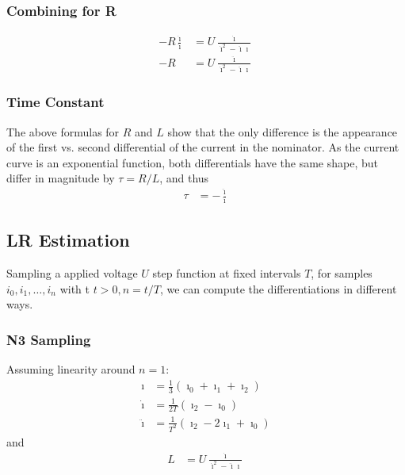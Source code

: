 \documentclass[12pt,a4paper,oneside,openany]{article}
\begin{document}
\subsubsection{Combining for R}
\begin{align}
- R \frac{\dot{\imath}}{\ddot{\imath}} &= U \frac{ \dot{\imath}}{ \dot{\imath}^2 - \ddot{\imath} \imath} \\
- R &= U \frac{ \ddot{\imath}}{ \dot{\imath}^2 - \ddot{\imath} \imath}
\end{align}

\subsubsection{Time Constant}

The above formulas for $R$ and $L$ show that the only difference is the appearance of the first vs. second differential of the current in the nominator. As the current curve is an exponential function, both differentials have the same shape, but differ in magnitude by $\tau=R/L$, and thus 
\begin{align}
\tau &= - \frac{\ddot{\imath}}{\dot{\imath}}
\end{align}

\subsection{LR Estimation}

Sampling a  applied voltage $U$ step function at fixed intervals $T$, for samples $i_0, i_1, \ldots, i_n$ with t $t>0,n=t/T$, we can compute the differentiations in different ways.

\subsubsection{N3 Sampling}

Assuming linearity around $n=1$:
\begin{align}
{\imath} &= \frac{1}{3} (\imath_0 + \imath_1 + \imath_2) \\
\dot{\imath} &= \frac{1}{2T} (\imath_2 - \imath_0) \\
\ddot{\imath} &= \frac{1}{T^2} (\imath_2 - 2\imath_1 + \imath_0)
\end{align}
and
\begin{align}
L &= U \frac{\dot{\imath}}{\dot{\imath}^2 - \ddot{\imath} \imath}
\end{align}
\end{document}
